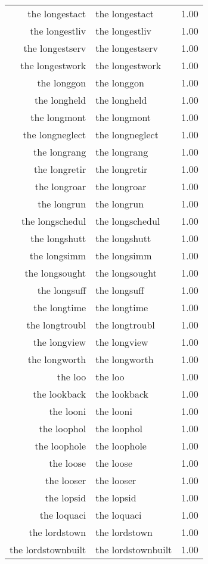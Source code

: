 \begin{table}[ht]
\begin{tabular}{rlr}
  the longestact & the longestact & 1.00 \\ 
  the longestliv & the longestliv & 1.00 \\ 
  the longestserv & the longestserv & 1.00 \\ 
  the longestwork & the longestwork & 1.00 \\ 
  the longgon & the longgon & 1.00 \\ 
  the longheld & the longheld & 1.00 \\ 
  the longmont & the longmont & 1.00 \\ 
  the longneglect & the longneglect & 1.00 \\ 
  the longrang & the longrang & 1.00 \\ 
  the longretir & the longretir & 1.00 \\ 
  the longroar & the longroar & 1.00 \\ 
  the longrun & the longrun & 1.00 \\ 
  the longschedul & the longschedul & 1.00 \\ 
  the longshutt & the longshutt & 1.00 \\ 
  the longsimm & the longsimm & 1.00 \\ 
  the longsought & the longsought & 1.00 \\ 
  the longsuff & the longsuff & 1.00 \\ 
  the longtime & the longtime & 1.00 \\ 
  the longtroubl & the longtroubl & 1.00 \\ 
  the longview & the longview & 1.00 \\ 
  the longworth & the longworth & 1.00 \\ 
  the loo & the loo & 1.00 \\ 
  the lookback & the lookback & 1.00 \\ 
  the looni & the looni & 1.00 \\ 
  the loophol & the loophol & 1.00 \\ 
  the loophole & the loophole & 1.00 \\ 
  the loose & the loose & 1.00 \\ 
  the looser & the looser & 1.00 \\ 
  the lopsid & the lopsid & 1.00 \\ 
  the loquaci & the loquaci & 1.00 \\ 
  the lordstown & the lordstown & 1.00 \\ 
  the lordstownbuilt & the lordstownbuilt & 1.00 \\ 

\end{tabular}
\end{table}
